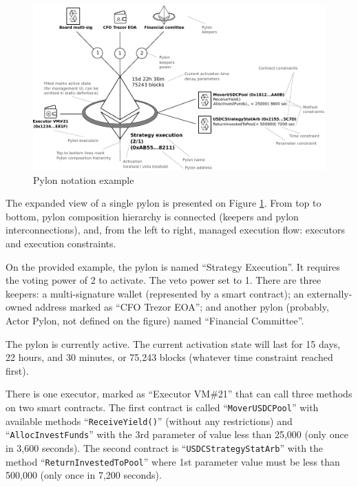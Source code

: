 \documentclass[12pt]{article}
\begin{document}
\medskip


\begin{figure}[h]
  \hspace*{-1cm}
    \includegraphics[width=1.25\textwidth]{pylon_sign_scheme_v2.pdf}
    \caption[Figure 1]{Pylon notation example\label{fig:pylon_notation_example}}
\end{figure}

\bigskip
The expanded view of a single pylon is presented on Figure \ref{fig:pylon_notation_example}.
From top to bottom, pylon composition hierarchy is connected (keepers and pylon interconnections), and, from the left to right, managed execution flow: executors and execution constraints.

\smallskip
On the provided example, the pylon is named ``Strategy Execution''. It requires the voting power of 2 to activate. The veto power set to 1. There are three keepers: a multi-signature wallet (represented by a smart contract); an externally-owned address marked as ``CFO Trezor EOA''; and another pylon (probably, Actor Pylon, not defined on the figure) named ``Financial Committee''.

\smallskip
The pylon is currently active. The current activation state will last for 15 days, 22 hours, and 30 minutes, or 75,243 blocks (whatever time constraint reached first).

There is one executor, marked as ``Executor VM\#21'' that can call three methods on two smart contracts. The first contract is called ``\texttt{MoverUSDCPool}'' with available methods ``\texttt{ReceiveYield()}'' (without any restrictions) and  ``\texttt{AllocInvestFunds}'' with the 3rd parameter of value less than 25,000 (only once in 3,600 seconds). The second contract is ``\texttt{USDCStrategyStatArb}'' with the method ``\texttt{ReturnInvestedToPool}'' where 1st parameter value must be less than 500,000 (only once in 7,200 seconds).
\end{document}
